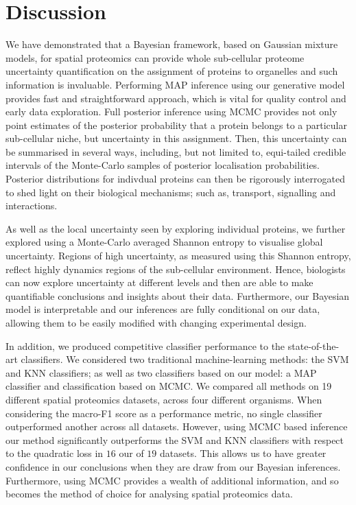 \documentclass[12pt,english]{article}\usepackage[]{graphicx}\usepackage[]{color}
\begin{document}
\section*{Discussion}

We have demonstrated that a Bayesian framework, based on Gaussian
mixture models, for spatial proteomics can provide whole sub-cellular
proteome uncertainty quantification on the assignment of proteins to
organelles and such information is invaluable. Performing MAP
inference using our generative model provides fast and straightforward
approach, which is vital for quality control and early data
exploration. Full posterior inference using MCMC provides not only
point estimates of the posterior probability that a protein belongs to
a particular sub-cellular niche, but uncertainty in this
assignment. Then, this uncertainty can be summarised in several ways,
including, but not limited to, equi-tailed credible intervals of the
Monte-Carlo samples of posterior localisation probabilities.
Posterior distributions for indivdual proteins can then be rigorously
interrogated to shed light on their biological mechanisms; such as,
transport, signalling and interactions.

As well as the local uncertainty seen by exploring individual
proteins, we further explored using a Monte-Carlo averaged Shannon
entropy to visualise global uncertainty. Regions of high uncertainty,
as measured using this Shannon entropy, reflect highly dynamics
regions of the sub-cellular environment.  Hence, biologists can now
explore uncertainty at different levels and then are able to make
quantifiable conclusions and insights about their data.  Furthermore,
our Bayesian model is interpretable and our inferences are fully
conditional on our data, allowing them to be easily modified with
changing experimental design.

In addition, we produced competitive classifier performance to the
state-of-the-art classifiers. We considered two traditional
machine-learning methods: the SVM and KNN classifiers; as well as two
classifiers based on our model: a MAP classifier and classification
based on MCMC. We compared all methods on 19 different spatial
proteomics datasets, across four different organisms. When considering
the macro-F1 score as a performance metric, no single classifier
outperformed another across all datasets. However, using MCMC based
inference our method significantly outperforms the SVM and KNN
classifiers with respect to the quadratic loss in $16$ our of $19$
datasets. This allows us to have greater confidence in our conclusions
when they are draw from our Bayesian inferences. Furthermore, using
MCMC provides a wealth of additional information, and so becomes the
method of choice for analysing spatial proteomics data.
\end{document}
